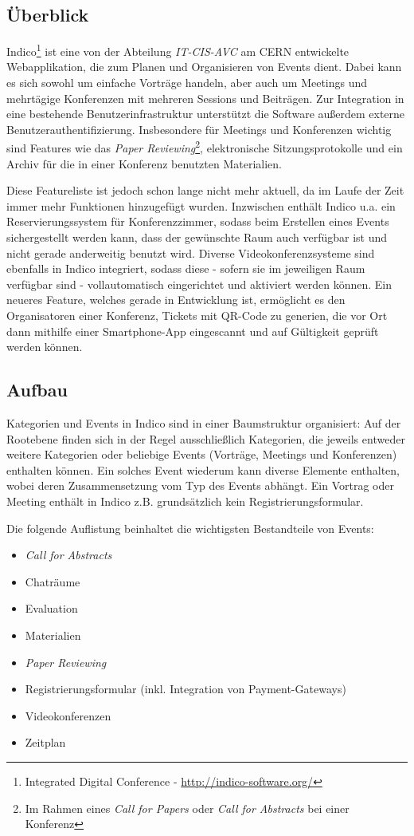 \subsection{Überblick}
Indico\footnote{Integrated Digital Conference - \href{http://indico-software.org/}{http://indico-software.org/}}
ist eine von der Abteilung \emph{IT-CIS-AVC} am CERN entwickelte Webapplikation, die zum Planen und
Organisieren von Events dient. Dabei kann es sich sowohl um einfache Vorträge handeln, aber auch um
Meetings und mehrtägige Konferenzen mit mehreren Sessions und Beiträgen. Zur Integration in eine
bestehende Benutzerinfrastruktur unterstützt die Software außerdem externe
Benutzerauthentifizierung. Insbesondere für Meetings und Konferenzen wichtig sind Features wie das
\emph{Paper Reviewing}\footnote{Im Rahmen eines \emph{Call for Papers} oder \emph{Call for
Abstracts} bei einer Konferenz}, elektronische Sitzungsprotokolle und ein Archiv für die in einer
Konferenz benutzten Materialien. \citep{indico}

Diese Featureliste ist jedoch schon lange nicht mehr aktuell, da im Laufe der Zeit immer mehr
Funktionen hinzugefügt wurden. Inzwischen enthält Indico u.a. ein Reservierungssystem für
Konferenzzimmer, sodass beim Erstellen eines Events sichergestellt werden kann, dass der gewünschte
Raum auch verfügbar ist und nicht gerade anderweitig benutzt wird. Diverse Videokonferenzsysteme
sind ebenfalls in Indico integriert, sodass diese - sofern sie im jeweiligen Raum verfügbar sind -
vollautomatisch eingerichtet und aktiviert werden können. Ein neueres Feature, welches gerade in
Entwicklung ist, ermöglicht es den Organisatoren einer Konferenz, Tickets mit QR-Code zu generien,
die vor Ort dann mithilfe einer Smartphone-App eingescannt und auf Gültigkeit geprüft werden können.

\subsection{Aufbau}
Kategorien und Events in Indico sind in einer Baumstruktur organisiert: Auf der Rootebene finden
sich in der Regel ausschließlich Kategorien, die jeweils entweder weitere Kategorien oder beliebige
Events (Vorträge, Meetings und Konferenzen) enthalten können. Ein solches Event wiederum kann
diverse Elemente enthalten, wobei deren Zusammensetzung vom Typ des Events abhängt. Ein Vortrag oder
Meeting enthält in Indico z.B. grundsätzlich kein Registrierungsformular.

Die folgende Auflistung beinhaltet die wichtigsten Bestandteile von Events:
\begin{itemize}
\item \emph{Call for Abstracts}
\item Chaträume
\item Evaluation
\item Materialien
\item \emph{Paper Reviewing}
\item Registrierungsformular (inkl. Integration von Payment-Gateways)
\item Videokonferenzen
\item Zeitplan
\end{itemize}


